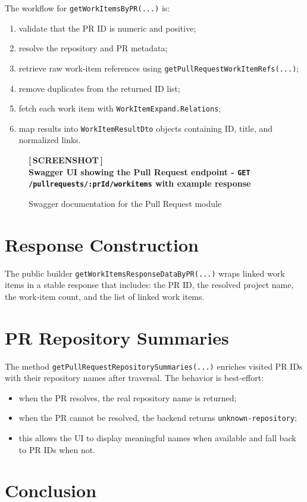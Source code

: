 \documentclass[12pt,a4paper]{report}
\newcommand{\screenshot}[2][Screenshot placeholder]{%
  \begin{figure}[H]
    \centering
    \begin{tcolorbox}[
      enhanced,
      colback=screenshotbg,
      colframe=screenshotborder,
      boxrule=1pt,
      arc=4pt,
      left=4pt, right=4pt, top=4pt, bottom=4pt,
      width=\textwidth,
      height=7cm,
      valign=center,
    ]
      \centering
      \color{primary}
      \large\bfseries [\,SCREENSHOT\,]\\[6pt]
      \normalsize\normalfont\color{darkgray}#1
    \end{tcolorbox}
    \caption{#2}
  \end{figure}%
}
\newcommand{\code}[1]{\texttt{\small\color{codered}#1}}
\begin{document}
The workflow for \code{getWorkItemsByPR(...)} is:

\begin{enumerate}
  \item validate that the PR ID is numeric and positive;
  \item resolve the repository and PR metadata;
  \item retrieve raw work-item references using \code{getPullRequestWorkItemRefs(...)};
  \item remove duplicates from the returned ID list;
  \item fetch each work item with \code{WorkItemExpand.Relations};
  \item map results into \code{WorkItemResultDto} objects containing ID, title, and normalized links.
\end{enumerate}

\screenshot[Swagger UI showing the Pull Request endpoint - \texttt{GET /pullrequests/:prId/workitems} with example response]{Swagger documentation for the Pull Request module}

\section{Response Construction}

The public builder \code{getWorkItemsResponseDataByPR(...)} wraps linked work
items in a stable response that includes: the PR ID, the resolved project name,
the work-item count, and the list of linked work items.

\section{PR Repository Summaries}

The method \code{getPullRequestRepositorySummaries(...)} enriches visited PR IDs
with their repository names after traversal. The behavior is best-effort:

\begin{itemize}
  \item when the PR resolves, the real repository name is returned;
  \item when the PR cannot be resolved, the backend returns \code{unknown-repository};
  \item this allows the UI to display meaningful names when available and fall back to PR IDs when not.
\end{itemize}

\section{Conclusion}
\end{document}
